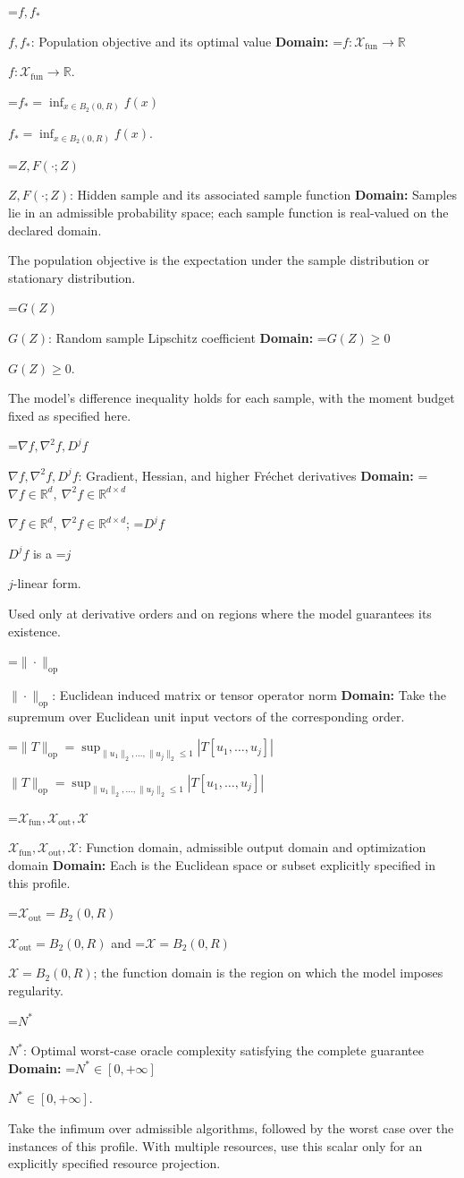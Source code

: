 \documentclass[10pt,a4paper]{article}
\newcommand{\AtlasMath}[1]{\par\begingroup\centering\setbox0=\hbox{$\displaystyle #1$}\ifdim\wd0>1.4\linewidth\typeout{ATLAS WIDE FORMULA: \the\wd0}\fi\ifdim\wd0>\linewidth\resizebox{\linewidth}{!}{\box0}\else\box0\fi\par\endgroup}
\newcommand{\AtlasInlineMath}[1]{\begingroup\setbox0=\hbox{$#1$}\ifdim\wd0>.4\linewidth\endgroup\AtlasMath{#1}\else\endgroup$#1$\fi}
\begin{document}
\AtlasInlineMath{f,f_*}: Population objective and its optimal value \textbf{Domain:} \AtlasInlineMath{f:\mathcal{X}_{\mathrm{fun}}\to\mathbb{R}}.

\AtlasInlineMath{f_*=\inf_{x\in B_2(0,R)}f(x)}.

\AtlasInlineMath{Z,F(\cdot;Z)}: Hidden sample and its associated sample function \textbf{Domain:} Samples lie in an admissible probability space; each sample function is real-valued on the declared domain.

The population objective is the expectation under the sample distribution or stationary distribution.

\AtlasInlineMath{G(Z)}: Random sample Lipschitz coefficient \textbf{Domain:} \AtlasInlineMath{G(Z)\ge0}.

The model's difference inequality holds for each sample, with the moment budget fixed as specified here.

\AtlasInlineMath{\nabla f,\nabla^2f,D^jf}: Gradient, Hessian, and higher Fréchet derivatives \textbf{Domain:} \AtlasInlineMath{\nabla f\in\mathbb{R}^d,\ \nabla^2f\in\mathbb{R}^{d\times d}}; \AtlasInlineMath{D^jf} is a \AtlasInlineMath{j}-linear form.

Used only at derivative orders and on regions where the model guarantees its existence.

\AtlasInlineMath{\|\cdot\|_{\mathrm{op}}}: Euclidean induced matrix or tensor operator norm \textbf{Domain:} Take the supremum over Euclidean unit input vectors of the corresponding order.

\AtlasInlineMath{\|T\|_{\mathrm{op}}=\sup_{\|u_1\|_2,\ldots,\|u_j\|_2\le1}|T[u_1,\ldots,u_j]|}

\AtlasInlineMath{\mathcal{X}_{\mathrm{fun}},\mathcal{X}_{\mathrm{out}},\mathcal{X}}: Function domain, admissible output domain and optimization domain \textbf{Domain:} Each is the Euclidean space or subset explicitly specified in this profile.

\AtlasInlineMath{\mathcal{X}_{\mathrm{out}}=B_2(0,R)} and \AtlasInlineMath{\mathcal{X}=B_2(0,R)}; the function domain is the region on which the model imposes regularity.

\AtlasInlineMath{N^*}: Optimal worst-case oracle complexity satisfying the complete guarantee \textbf{Domain:} \AtlasInlineMath{N^*\in[0,+\infty]}.

Take the infimum over admissible algorithms, followed by the worst case over the instances of this profile. With multiple resources, use this scalar only for an explicitly specified resource projection.
\end{document}
